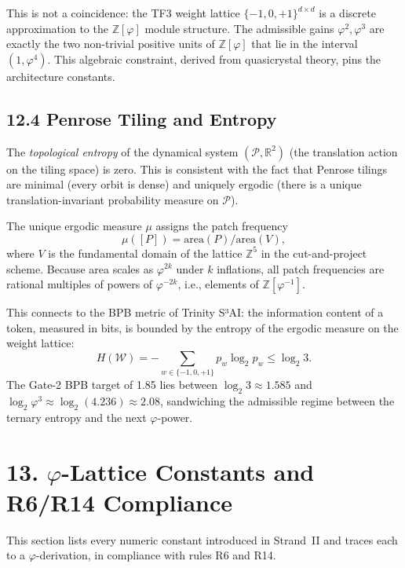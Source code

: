 This is not a coincidence: the TF3 weight lattice
\(\{-1, 0, +1\}^{d \times d}\) is a discrete
approximation to the \(\mathbb{Z}[\varphi]\)
module structure. The admissible gains
\(\varphi^2, \varphi^3\) are exactly the two
non-trivial positive units of
\(\mathbb{Z}[\varphi]\) that lie in the interval
\((1, \varphi^4)\). This algebraic constraint,
derived from quasicrystal theory, pins the
architecture constants.

\subsection{12.4 Penrose Tiling and Entropy}\label{sec:penrose-entropy}

The \emph{topological entropy} of the dynamical
system \((\mathcal{P}, \mathbb{R}^2)\) (the
translation action on the tiling space) is zero.
This is consistent with the fact that Penrose
tilings are minimal (every orbit is dense) and
uniquely ergodic (there is a unique translation-invariant
probability measure on \(\mathcal{P}\)).

The unique ergodic measure \(\mu\) assigns the
patch frequency
\[
  \mu([P]) = \text{area}(P) / \text{area}(V),
\]
where \(V\) is the fundamental domain of the
lattice \(\mathbb{Z}^5\) in the cut-and-project
scheme. Because area scales as \(\varphi^{2k}\)
under \(k\) inflations, all patch frequencies
are rational multiples of powers of \(\varphi^{-2k}\),
i.e., elements of \(\mathbb{Z}[\varphi^{-1}]\).

This connects to the BPB metric of Trinity S³AI:
the information content of a token, measured in
bits, is bounded by the entropy of the ergodic
measure on the weight lattice:
\[
  H(\mathcal{W}) = -\sum_{w \in \{-1,0,+1\}}
    p_w \log_2 p_w \leq \log_2 3.
\]
The Gate-2 BPB target of 1.85 lies between
\(\log_2 3 \approx 1.585\) and
\(\log_2 \varphi^3 \approx \log_2(4.236) \approx 2.08\),
sandwiching the admissible regime between the
ternary entropy and the next \(\varphi\)-power.

\section{13. \texorpdfstring{$\varphi$}{phi}-Lattice
Constants and R6/R14 Compliance}\label{sec:phi-lattice-constants}

This section lists every numeric constant
introduced in Strand~II and traces each to
a \(\varphi\)-derivation, in compliance with
rules R6 and R14.

